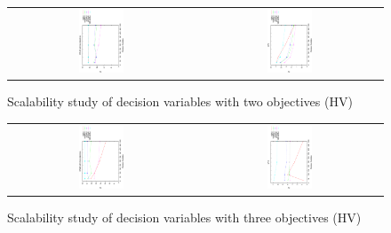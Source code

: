 \begin{figure}[t]
\centering
\caption{Scalability study of decision variables with two objectives (HV)}
\label{fig:Scalability_Study_HV_1}
\begin{tabular}{cc}
   \includegraphics[width=0.25\textwidth, angle=-90,origin=c]{Images/DTLZ4_2obj.eps} &
    \includegraphics[width=0.25\textwidth, angle=-90,origin=c]{Images/UF5.eps}  
\end{tabular}
\end{figure}
\begin{figure}[t]
\centering
\caption{Scalability study of decision variables with three objectives (HV)}
\label{fig:Scalability_Study_HV_2}
\begin{tabular}{cc}
    \includegraphics[width=0.25\textwidth, angle=-90,origin=c]{Images/DTLZ4_3obj.eps} &
    \includegraphics[width=0.25\textwidth, angle=-90,origin=c]{Images/UF10.eps}
\end{tabular}
\end{figure}
